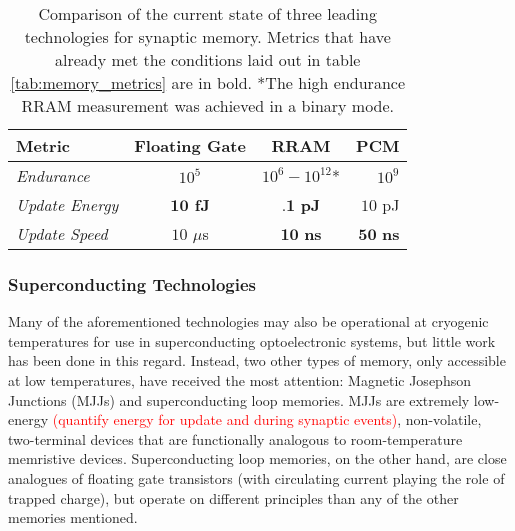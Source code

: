 \documentclass[twocolumn]{article}
\begin{document}
\begin{table}[h!]
  \begin{center}
    \label{tab:memory_comparison}
    \begin{tabular}{l|c|c|r} %
      \textbf{Metric} & \textbf{Floating Gate} & \textbf{RRAM} &\textbf{PCM} \\
      \hline
      \textit{Endurance} & $10^{5}$ & $10^{6}-10^{12}$* & $10^{9}$  \\
      \textit{Update Energy} & \textbf{$\textbf{10}$ fJ} & $\textbf{.1}$ \textbf{pJ} & $10$ pJ\\
      \textit{Update Speed} & $10$ $\mu$s  & $\textbf{10}$ \textbf{ns} & $\textbf{50}$ \textbf{ns}\\
    \end{tabular}
    \caption{Comparison of the current state of three leading technologies for synaptic memory. Metrics that have already met the conditions laid out in table \ref{tab:memory_metrics} are in bold. *The high endurance RRAM measurement was achieved in a binary mode.}
  \end{center}
\end{table}

\subsubsection{Superconducting Technologies}
Many of the aforementioned technologies may also be operational at cryogenic temperatures for use in superconducting optoelectronic systems, but little work has been done in this regard. Instead, two other types of memory, only accessible at low temperatures, have received the most attention: Magnetic Josephson Junctions (MJJs) and superconducting loop memories. MJJs are extremely low-energy \textcolor{red}{(quantify energy for update and during synaptic events)}, non-volatile, two-terminal devices that are functionally analogous to room-temperature memristive devices. Superconducting loop memories, on the other hand, are close analogues of floating gate transistors (with circulating current playing the role of trapped charge), but operate on different principles than any of the other memories mentioned.
\end{document}
